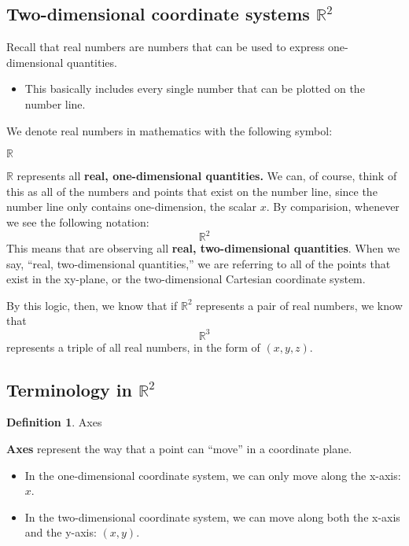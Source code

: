 \documentclass{report}
\newcommand{\R}{\mathbb{R}}
\begin{document}
\begin{sloppypar}
\subsection{Two-dimensional coordinate systems $ \R^{2} $}
Recall that real numbers are numbers that
can be used to express one-dimensional
quantities.
\begin{itemize}
  \item This basically includes
        every single number that can be
        plotted on the number line.
\end{itemize}
We denote real numbers in mathematics with
the following symbol:
\begin{center}
  $ \R $
\end{center}
$ \R $ represents all \textbf{real,  one-dimensional
  quantities.} We can, of course,
think of this as all of the numbers and points
that exist on the number line, since
the number line only contains one-dimension,
the scalar $x$.
By comparision, whenever we see
the following notation:
\[ \R^{2}\]
This means that are observing all \textbf{real, two-dimensional quantities}.
When we say, ``real, two-dimensional
quantities,'' we are referring to all of
the points that exist in the xy-plane, or
the two-dimensional Cartesian coordinate
system.
\par By this logic, then, we know that if
$ \R^{2} $ represents a pair of real numbers,
we know that
\[ \R^{3} \]
represents a triple of all real numbers, in
the form of $ (x, y, z)$.

\subsection{Terminology in $\R^{2}$}
\theoremstyle{definition}
\newtheorem{definition}{Definition}
\begin{definition}
  Axes
\end{definition}
\textbf{Axes} represent the way that a point can
``move'' in a coordinate plane.
\begin{itemize}
  \item In the one-dimensional coordinate
        system, we can only move along the
        x-axis: $ x $.
  \item In the two-dimensional
        coordinate system, we can move
        along both the x-axis and the y-axis:
        $ (x, y) $.
\end{itemize}


\end{sloppypar}
\end{document}
